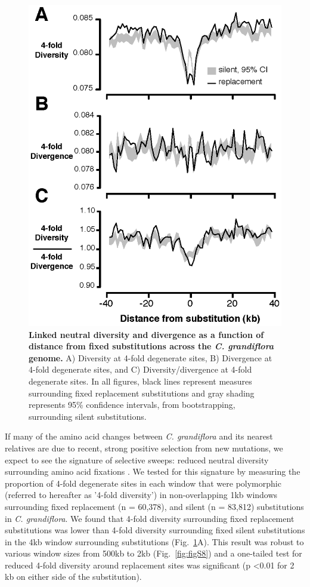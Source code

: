 \begin{figure}[ht!]
      \centering
       \includegraphics{Ch2Fig2}
    \caption{\textbf{Linked neutral diversity and divergence as a function of distance from fixed substitutions across the \textit{C. grandiflora} genome.} A) Diversity at 4-fold degenerate sites, B) Divergence at 4-fold degenerate sites, and C) Diversity/divergence at 4-fold degenerate sites. In all figures, black lines represent measures surrounding fixed replacement substitutions and gray shading represents 95\% confidence intervals, from bootstrapping, surrounding silent substitutions.}
    \label{fig:fig2}
\end{figure}

If many of the amino acid changes between \textit{C. grandiflora} and its nearest relatives are due to recent, strong positive selection from new mutations, we expect to see the signature of selective sweeps: reduced neutral diversity surrounding amino acid fixations \citep{Smith1974,Sattath2011-ns}. We tested for this signature by measuring the proportion of 4-fold degenerate sites in each window that were polymorphic (referred to hereafter as '4-fold diversity') in non-overlapping 1kb windows surrounding fixed replacement (n = 60,378), and silent (n = 83,812) substitutions in \textit{C. grandiflora}. We found that 4-fold diversity surrounding fixed replacement substitutions was lower than 4-fold diversity surrounding fixed silent substitutions in the 4kb window surrounding substitutions (Fig.~\ref{fig:fig2}A). This result was robust to various window sizes from 500kb to 2kb (Fig.~\ref{fig:figS8}) and a one-tailed test for reduced 4-fold diversity around replacement sites was significant (p \textless  0.01 for 2 kb on either side of the substitution).

